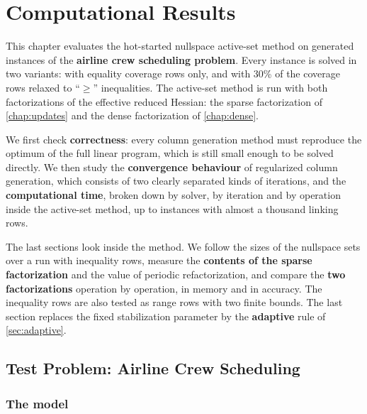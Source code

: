 \chapter{Computational Results}
\label{chap:results}

\vspace*{\fill}

This chapter evaluates the hot-started nullspace active-set method on generated instances of
the \textbf{airline crew scheduling problem}. Every instance is solved in two variants: with
equality coverage rows only, and with 30\% of the coverage rows relaxed to ``$\ge$''
inequalities. The active-set method is run with both factorizations of the effective reduced
Hessian: the sparse factorization of \cref{chap:updates} and the dense factorization of
\cref{chap:dense}.

\medskip

We first check \textbf{correctness}: every column generation method must reproduce the
optimum of the full linear program, which is still small enough to be solved directly. We
then study the \textbf{convergence behaviour} of regularized column generation, which
consists of two clearly separated kinds of iterations, and the \textbf{computational time},
broken down by solver, by iteration and by operation inside the active-set method, up to
instances with almost a thousand linking rows.

\medskip

The last sections look inside the method. We follow the sizes of the nullspace sets over a run
with inequality rows, measure the \textbf{contents of the sparse factorization} and the value
of periodic refactorization, and compare the \textbf{two factorizations} operation by
operation, in memory and in accuracy. The inequality rows are also tested as range rows with
two finite bounds. The last section replaces the fixed stabilization
parameter by the \textbf{adaptive} rule of \cref{sec:adaptive}.

\vspace*{\fill}

\newpage


\section{Test Problem: Airline Crew Scheduling}
\label{sec:test-problem}

\subsection{The model}

